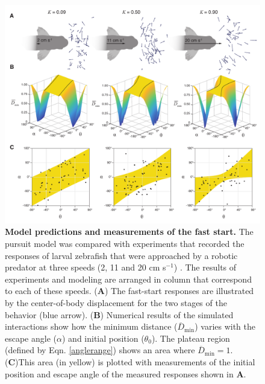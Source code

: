\documentclass[12pt]{article}
\newcommand{\ol}{\overline}
\begin{document}
\pagebreak
\begin{figure}[t]
\begin{centering}
\includegraphics[width=1\textwidth]{Fig_03.pdf}
\centering	
\caption{
\textbf{Model predictions and measurements of the fast start.} 
The pursuit model was compared with experiments that recorded the
responses of larval zebrafish that were approached by a robotic predator at
three speeds (2, 11 and 20 cm s$^{-1}$) \citep{Stewart:2014cm}. The results of
experiments and modeling are arranged in column that correspond to each of
these speeds.
(\textbf{A}) The fast-start responses are illustrated by the center-of-body
displacement for the two stages of the behavior (blue arrow). 
(\textbf{B}) Numerical results of the simulated interactions show how
the minimum distance  ($\ol D_{\text{min}}$)  varies with the escape angle
($\alpha$) and initial position ($\theta_0$). The plateau region (defined by
Eqn. \ref{anglerange}) shows an area where $\ol D_{\text{min}}=1$. 
(\textbf{C})This area (in yellow) is plotted with measurements of the initial
position and escape angle of the measured responses shown in \textbf{A}.
}
\label{our_topo}
\end{centering}
\end{figure}
\end{document}
